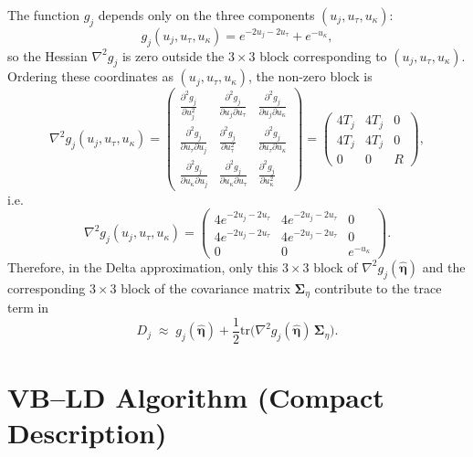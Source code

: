 \documentclass[11pt]{article}
\newcommand{\vect}[1]{\boldsymbol{#1}}
\newcommand{\mat}[1]{\mathbf{#1}}
\begin{document}
The function $g_j$ depends only on the three components $(u_j,u_\tau,u_\kappa)$:
\[
  g_j(u_j,u_\tau,u_\kappa) = e^{-2u_j-2u_\tau} + e^{-u_\kappa},
\]
so the Hessian $\nabla^2 g_j$ is zero outside the $3\times3$ block corresponding to $(u_j,u_\tau,u_\kappa)$. Ordering these coordinates as $(u_j,u_\tau,u_\kappa)$, the non-zero block is
\begin{equation}
  \nabla^2 g_j(u_j,u_\tau,u_\kappa)
  =
  \begin{pmatrix}
    \displaystyle \frac{\partial^2 g_j}{\partial u_j^2} &
    \displaystyle \frac{\partial^2 g_j}{\partial u_j \partial u_\tau} &
    \displaystyle \frac{\partial^2 g_j}{\partial u_j \partial u_\kappa} \\[6pt]
    \displaystyle \frac{\partial^2 g_j}{\partial u_\tau \partial u_j} &
    \displaystyle \frac{\partial^2 g_j}{\partial u_\tau^2} &
    \displaystyle \frac{\partial^2 g_j}{\partial u_\tau \partial u_\kappa} \\[6pt]
    \displaystyle \frac{\partial^2 g_j}{\partial u_\kappa \partial u_j} &
    \displaystyle \frac{\partial^2 g_j}{\partial u_\kappa \partial u_\tau} &
    \displaystyle \frac{\partial^2 g_j}{\partial u_\kappa^2}
  \end{pmatrix}
  =
  \begin{pmatrix}
    4T_j & 4T_j & 0 \\
    4T_j & 4T_j & 0 \\
    0    & 0    & R
  \end{pmatrix},
\end{equation}
i.e.
\begin{equation}
  \nabla^2 g_j(u_j,u_\tau,u_\kappa)
  =
  \begin{pmatrix}
    4 e^{-2u_j-2u_\tau} & 4 e^{-2u_j-2u_\tau} & 0 \\
    4 e^{-2u_j-2u_\tau} & 4 e^{-2u_j-2u_\tau} & 0 \\
    0                   & 0                   & e^{-u_\kappa}
  \end{pmatrix}.
\end{equation}
Therefore, in the Delta approximation, only this $3\times3$ block of $\nabla^2 g_j(\hat{\vect{\eta}})$ and the corresponding $3\times3$ block of the covariance matrix $\mat{\Sigma}_\eta$ contribute to the trace term in
\[
  D_j \;\approx\;
  g_j(\hat{\vect{\eta}})
  + \frac12 \mathrm{tr}\big( \nabla^2 g_j(\hat{\vect{\eta}})\, \mat{\Sigma}_\eta \big).
\]

\section{VB--LD Algorithm (Compact Description)}
\end{document}
